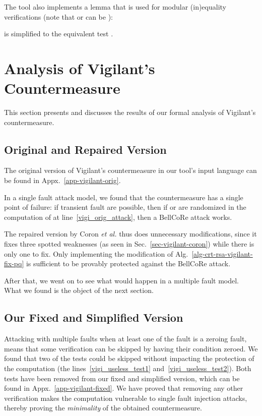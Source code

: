 \documentclass[10pt]{article}
\theoremstyle{definition}
\theoremstyle{theorem}
\newcommand{\etal}{\textit{et al.}\xspace}
\begin{document}
The tool also implements a lemma that is used for modular (in)equality verifications (note that  or  can be ):

is simplified to the equivalent test .

\section{Analysis of Vigilant's Countermeasure}
\label{sec-analysis}

This section presents and discusses the results of our formal analysis of Vigilant's countermeasure.

\subsection{Original and Repaired Version}

The original version of Vigilant's countermeasure in our tool's input language can be found in Appx.~\ref{app-vigilant-orig}.

In a single fault attack model, we found that the countermeasure has a single point of failure:
if transient fault are possible, then if  or  are randomized in the computation of  at line~\ref{vigi_orig_attack}, then a BellCoRe attack works.

The repaired version by Coron \etal thus does unnecessary modifications, since it fixes three spotted weaknesses (as seen in Sec.~\ref{sec-vigilant-coron}) while there is only one to fix.
Only implementing the modification of Alg.~\ref{alg-crt-rsa-vigilant-fix-pq} is sufficient to be provably protected against the BellCoRe attack.

After that, we went on to see what would happen in a multiple fault model.
What we found is the object of the next section.

\subsection{Our Fixed and Simplified Version}

Attacking with multiple faults when at least one of the fault is a zeroing fault, means that some verification can be skipped by having their condition zeroed.
We found that two of the tests could be skipped without impacting the protection of the computation (the lines~\ref{vigi_useless_test1} and~\ref{vigi_useless_test2}).
Both tests have been removed from our fixed and simplified version, which can be found in Appx.~\ref{app-vigilant-fixed}.
We have proved that removing any other verification makes the computation vulnerable to single fault injection attacks, thereby proving the \emph{minimality} of the obtained countermeasure.
\end{document}
